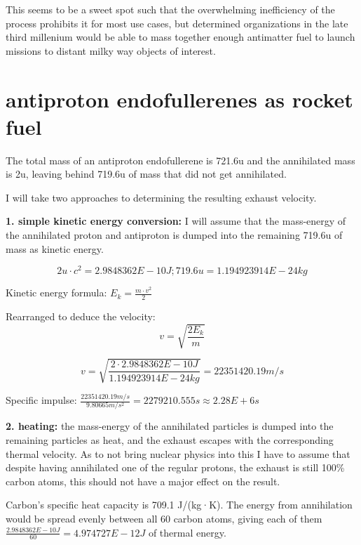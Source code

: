 \documentclass[a4paper]{article}
\begin{document}
    \medskip
    
    This seems to be a sweet spot such that the overwhelming inefficiency of the process prohibits it for most use cases, but determined organizations in the late third millenium would be able to mass together enough antimatter fuel to launch missions to distant milky way objects of interest.
    
    \pagebreak
    
    \section{antiproton endofullerenes as rocket fuel}
    
    The total mass of an antiproton endofullerene is 721.6u and the annihilated mass is 2u, leaving behind 719.6u of mass that did not get annihilated.
    
    \medskip
    
    I will take two approaches to determining the resulting exhaust velocity.
    
    \medskip
    
    \textbf{1. simple kinetic energy conversion:} I will assume that the mass-energy of the annihilated proton and antiproton is dumped into the remaining 719.6u of mass as kinetic energy.
    
    $$ 2u \cdot c^2 = 2.9848362 E-10 J ; 719.6u = 1.194923914 E-24 kg $$
    
    Kinetic energy formula: $E_k = \frac{m \cdot v^2}{2}$
    
    Rearranged to deduce the velocity: $$v = \sqrt{\frac{2 E_k}{m}}$$
    
    $$ v = \sqrt{\frac{2 \cdot 2.9848362 E-10 J}{1.194923914 E-24 kg}} = 22351420.19 m/s $$
    
    Specific impulse: $\frac{22351420.19 m/s}{9.80665 m/s^2} = 2279210.555 s \approx 2.28 E+6 s$
    
    \medskip
    
    \textbf{2. heating:} the mass-energy of the annihilated particles is dumped into the remaining particles as heat, and the exhaust escapes with the corresponding thermal velocity.
    As to not bring nuclear physics into this I have to assume that despite having annihilated one of the regular protons, the exhaust is still 100\% carbon atoms, this should not have a major effect on the result.
    
    \medskip
    
    Carbon's specific heat capacity is 709.1 J/(kg·K).
    The energy from annihilation would be spread evenly between all 60 carbon atoms, giving each of them $\frac{2.9848362 E-10 J}{60} = 4.974727 E-12 J$ of thermal energy.
    
\end{document}

